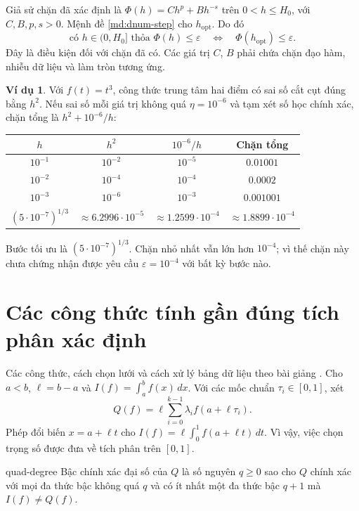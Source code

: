 \documentclass[12pt,a4paper,oneside]{book}
\numberwithin{algorithm}{chapter}
\theoremstyle{definition}
\newtheorem{vidu}{Ví dụ}[chapter]
\begin{document}
Giả sử chặn đã xác định là $\Phi(h)=Ch^p+Bh^{-s}$ trên $0<h\leq H_0$, với $C,B,p,s>0$. Mệnh đề \ref{md:dnum-step} cho $h_{\mathrm{opt}}$. Do đó
\[
 \text{có }h\in(0,H_0]\text{ thỏa }\Phi(h)\leq\varepsilon
 \quad\Longleftrightarrow\quad \Phi(h_{\mathrm{opt}})\leq\varepsilon.
\]
Đây là điều kiện đối với chặn đã có. Các giá trị $C$, $B$ phải chứa chặn đạo hàm, nhiễu dữ liệu và làm tròn tương ứng.

\begin{vidu}
Với $f(t)=t^3$, công thức trung tâm hai điểm có sai số cắt cụt đúng bằng $h^2$. Nếu sai số mỗi giá trị không quá $\eta=10^{-6}$ và tạm xét số học chính xác, chặn tổng là $h^2+10^{-6}/h$:
\begin{center}
\begin{tabular}{c|c|c|c}
\toprule
$h$ & $h^2$ & $10^{-6}/h$ & Chặn tổng\\
\midrule
$10^{-1}$ & $10^{-2}$ & $10^{-5}$ & $0.01001$\\
$10^{-2}$ & $10^{-4}$ & $10^{-4}$ & $0.0002$\\
$10^{-3}$ & $10^{-6}$ & $10^{-3}$ & $0.001001$\\
$(5\cdot10^{-7})^{1/3}$ & $\approx6.2996\cdot10^{-5}$ & $\approx1.2599\cdot10^{-4}$ & $\approx1.8899\cdot10^{-4}$\\
\bottomrule
\end{tabular}\end{center}
Bước tối ưu là $(5\cdot10^{-7})^{1/3}$. Chặn nhỏ nhất vẫn lớn hơn $10^{-4}$; vì thế chặn này chưa chứng nhận được yêu cầu $\varepsilon=10^{-4}$ với bất kỳ bước nào.
\end{vidu}

\section{Các công thức tính gần đúng tích phân xác định}
Các công thức, cách chọn lưới và cách xử lý bảng dữ liệu theo bài giảng \cite{integral-slides}.
Cho $a<b$, $\ell=b-a$ và $I(f)=\int_a^b f(x)\,dx$. Với các mốc chuẩn $\tau_i\in[0,1]$, xét
\begin{equation}\label{eq:quad-standard}
 Q(f)=\ell\sum_{i=0}^{k-1}\lambda_i f(a+\ell\tau_i).
\end{equation}
Phép đổi biến $x=a+\ell t$ cho $I(f)=\ell\int_0^1 f(a+\ell t)\,dt$. Vì vậy, việc chọn trọng số được đưa về tích phân trên $[0,1]$.

\begin{dinhnghia}{}{quad-degree}
Bậc chính xác đại số của $Q$ là số nguyên $q\geq0$ sao cho $Q$ chính xác với mọi đa thức bậc không quá $q$ và có ít nhất một đa thức bậc $q+1$ mà $I(f)\ne Q(f)$.
\end{dinhnghia}
\end{document}

